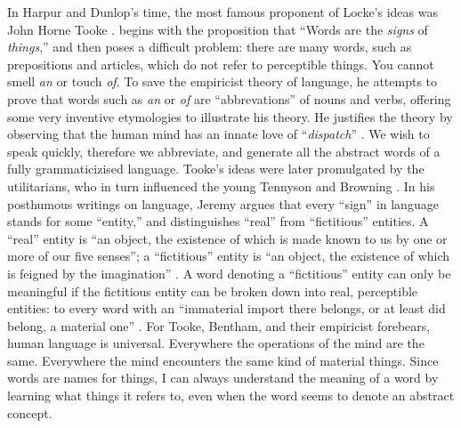 \documentclass[
  Crown,
  times,
  sageh]{sagej}
\begin{document}
In Harpur and Dunlop's time, the most famous proponent of Locke's ideas
was John Horne Tooke \citep[chap.~2]{aarsleff_study_1967}.
\citet[vol.~1, p.~18]{tooke_epea_1805} begins with the proposition that
``Words are the \emph{signs} of \emph{things},'' and then poses a
difficult problem: there are many words, such as prepositions and
articles, which do not refer to perceptible things. You cannot smell
\emph{an} or touch \emph{of}. To save the empiricist theory of language,
he attempts to prove that words such as \emph{an} or \emph{of} are
``abbrevations'' of nouns and verbs, offering some very inventive
etymologies to illustrate his theory. He justifies the theory by
observing that the human mind has an innate love of ``\emph{dispatch}''
\citeyearpar[vol.~1, p.~27]{tooke_epea_1805}. We wish to speak quickly,
therefore we abbreviate, and generate all the abstract words of a fully
grammaticizised language. Tooke's ideas were later promulgated by the
utilitarians, who in turn influenced the young Tennyson and Browning
\citep[642-643]{cooper_womens_2006}. In his posthumous writings on
language, Jeremy \citet{bentham_essay_1843} argues that every ``sign''
in language stands for some ``entity,'' and distinguishes ``real'' from
``fictitious'' entities. A ``real'' entity is ``an object, the existence
of which is made known to us by one or more of our five senses''; a
``fictitious'' entity is ``an object, the existence of which is feigned
by the imagination'' \citeyearpar[325]{bentham_essay_1843}. A word
denoting a ``fictitious'' entity can only be meaningful if the
fictitious entity can be broken down into real, perceptible entities: to
every word with an ``immaterial import there belongs, or at least did
belong, a material one'' \citeyearpar[329]{bentham_essay_1843}. For
Tooke, Bentham, and their empiricist forebears, human language is
universal. Everywhere the operations of the mind are the same.
Everywhere the mind encounters the same kind of material things. Since
words are names for things, I can always understand the meaning of a
word by learning what things it refers to, even when the word seems to
denote an abstract concept.
\end{document}
